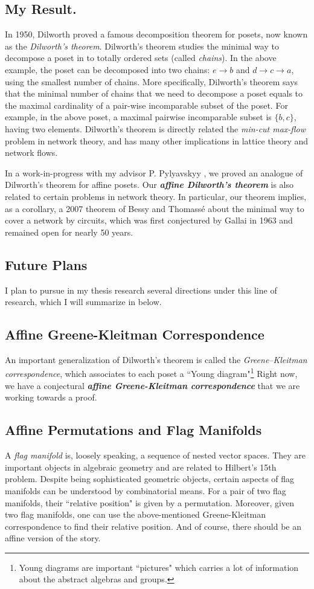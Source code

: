 \documentclass[11pt]{amsart}
\newcommand{\Emph}[1]{\textbf{\emph{#1}}}
\begin{document}
\subsection*{My Result.} In 1950, Dilworth \cite{dilworth1950decomposition} proved a famous decomposition theorem for posets, now known as the \emph{Dilworth's theorem}. Dilworth's theorem studies the minimal way to decompose a poset in to totally ordered sets (called \emph{chains}). In the above example, the poset can be decomposed into two chains: $e\to b$ and $d\to c\to a$, using the smallest number of chains. More specifically, Dilworth's theorem says that the minimal number of chains that we need to decompose a poset equals to the maximal cardinality of a pair-wise incomparable subset of the poset. For example, in the above poset, a maximal pairwise incomparable subset is $\{b,c\}$, having two elements. Dilworth's theorem is directly related the \emph{min-cut max-flow} problem in network theory, and has many other implications in lattice theory and network flows.

In a work-in-progress with my advisor P. Pylyavskyy \cite{PZ}, we proved an analogue of Dilworth's theorem for affine posets. Our \Emph{affine Dilworth's theorem} is also related to certain problems in network theory. In particular, our theorem implies, as a corollary, a 2007 theorem of Bessy and Thomass\'{e} \cite{bessy2007} about the minimal way to cover a network by circuits, which was first conjectured by Gallai in 1963 and remained open for nearly 50 years.


\subsection{Future Plans}I plan to pursue in my thesis research several directions under this line of research, which I will summarize in below.
\subsection*{Affine Greene-Kleitman Correspondence}
An important generalization of Dilworth's theorem is called the \emph{Greene--Kleitman correspondence}, which associates to each poset a ``Young diagram"\footnote{Young diagrams are important ``pictures" which carries a lot of information about the abstract algebras and groups.} Right now, we have a conjectural \Emph{affine Greene-Kleitman correspondence} that we are working towards a proof. 

\subsection*{Affine Permutations and Flag Manifolds} A \emph{flag manifold} is, loosely speaking, a sequence of nested vector spaces.
They are important objects in algebraic geometry and are related to Hilbert's 15th problem. Despite being sophisticated geometric objects, certain aspects of flag manifolds can be understood by combinatorial means. For a pair of two flag manifolds, their ``relative position" is given by a permutation. Moreover, given two flag manifolds, one can use the above-mentioned Greene-Kleitman correspondence to find their relative position. And of course, there should be an affine version of the story.
\end{document}
